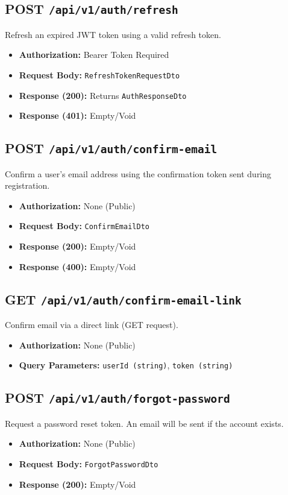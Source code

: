 \subsection{POST \texttt{/api/v1/auth/refresh}}
Refresh an expired JWT token using a valid refresh token.
\begin{itemize}
    \item \textbf{Authorization:} Bearer Token Required
    \item \textbf{Request Body:} \texttt{RefreshTokenRequestDto}
    \item \textbf{Response (200):} Returns \texttt{AuthResponseDto}
    \item \textbf{Response (401):} Empty/Void
\end{itemize}

\subsection{POST \texttt{/api/v1/auth/confirm-email}}
Confirm a user's email address using the confirmation token sent during registration.
\begin{itemize}
    \item \textbf{Authorization:} None (Public)
    \item \textbf{Request Body:} \texttt{ConfirmEmailDto}
    \item \textbf{Response (200):} Empty/Void
    \item \textbf{Response (400):} Empty/Void
\end{itemize}

\subsection{GET \texttt{/api/v1/auth/confirm-email-link}}
Confirm email via a direct link (GET request).
\begin{itemize}
    \item \textbf{Authorization:} None (Public)
    \item \textbf{Query Parameters:} \texttt{userId (string)}, \texttt{token (string)}
\end{itemize}

\subsection{POST \texttt{/api/v1/auth/forgot-password}}
Request a password reset token. An email will be sent if the account exists.
\begin{itemize}
    \item \textbf{Authorization:} None (Public)
    \item \textbf{Request Body:} \texttt{ForgotPasswordDto}
    \item \textbf{Response (200):} Empty/Void
\end{itemize}

